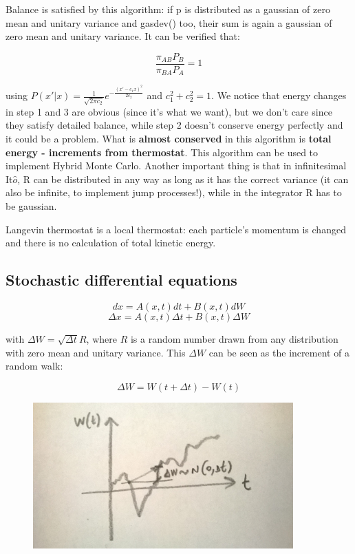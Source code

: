 \documentclass[a4paper, italian, openany]{book}
\begin{document}
Balance is satisfied by this algorithm: if p is distributed as a gaussian of zero mean and unitary variance and gasdev() too, their sum is again a gaussian of zero mean and unitary variance.\newline
It can be verified that:

$$\frac{\pi_{AB}P_B}{\pi_{BA} P_A} = 1$$

using $P(x' | x) = \frac{1}{\sqrt{2\pi c_2}} e^{-\frac{(x' -c_1 x)^2}{2 c_2}}$ and $c_1^2 + c_2^2 = 1$.\newline
We notice that energy changes in step 1 and 3 are obvious (since it's what we want), but we don't care since they satisfy detailed balance, while step 2 doesn't conserve energy perfectly and it could be a problem. What is \textbf{almost conserved} in this algorithm is \textbf{total energy - increments from thermostat}.\newline
This algorithm can be used to implement Hybrid Monte Carlo. Another important thing is that in infinitesimal It$\hat{o}$, R can be distributed in any way as long as it has the correct variance (it can also be infinite, to implement jump processes!), while in the integrator R has to be gaussian.

Langevin thermostat is a local thermostat: each particle's momentum is changed and there is no calculation of total kinetic energy.

\subsection{Stochastic differential equations}

$$dx = A(x, t)dt + B(x, t)dW$$
$$\Delta x = A(x, t) \Delta t + B(x, t)\Delta W$$

with $\Delta W = \sqrt{\Delta t} R$, where $R$ is a random number drawn from any distribution with zero mean and unitary variance. This $\Delta W$ can be seen as the increment of a random walk:

$$\Delta W = W(t+\Delta t) - W(t)$$

\begin{figure}[H]
\centering
\includegraphics[width=100mm]{img/pic22.jpg}
\end{figure}
\end{document}
